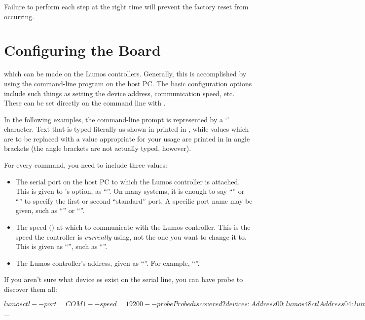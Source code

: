 \documentclass[letterpaper,twoside,onecolumn,openright,final]{memoir}
\begin{document}
Failure to perform each step at the right time will prevent the factory reset from occurring.

\chapter{Configuring the Board}
 which can be made on the Lumos controllers.  Generally,
this is accomplished by using the  com\-mand-line program on the host PC.  The basic configuration
options include such things as setting the device address, communication speed, etc.  These can be set
directly on the command line with .

In the following examples, the command-line prompt is represented by a `\z{\$}' character.
Text that is typed literally as shown in printed in , while values which are
to be replaced with a value appropriate for your usage are printed in  in angle brackets
(the angle brackets are not actually typed, however).

For every command, you need to include three values:
\begin{itemize}
	\item 	The serial port on the host PC to which the Lumos controller is attached.  This is
		given to 's  option, as ``''.  On many
		systems, it is enough to say ``'' or ``'' to specify the first
		or second ``standard'' port.  A specific port name may be given, such as 
		``'' or ``''.
	\item	The speed () at which to communicate with the Lumos controller.  This is
		the speed the controller is \emph{currently} using, not the one you want to change it
		to.  This is given as ``'', such as ``''.
	\item	The Lumos controller's address, given as ``''.  For example,
		``''.
\end{itemize}

If you aren't sure what device es exist on the serial line, you can have  
probe to discover them all:
\begin{SourceCode}
$ lumosctl --port=COM1 --speed=19200 --probe
Probe discovered 2 devices:
Address 00: lumos48ctl
Address 04: lumos24dc
$ _
\end{SourceCode}
\end{document}
